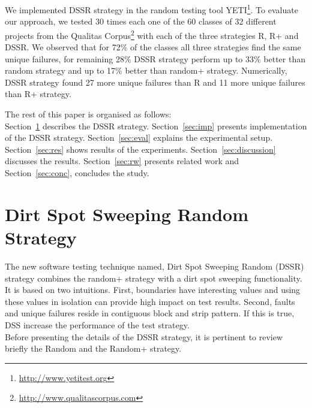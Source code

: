 \documentclass{acm_proc_article-sp}
\begin{document}
We implemented DSSR strategy in the random testing tool YETI\footnote{\url{http://www.yetitest.org}}. To evaluate our approach, we tested 30 times each one of the 60 classes of 32 different projects from the Qualitas Corpus\footnote{\url{http://www.qualitascorpus.com}} with each of the three strategies R, R+ and DSSR. We observed that for 72\% of the classes all three strategies find the same unique failures, for remaining 28\% DSSR strategy perform up to 33\% better than random strategy and up to 17\% better than random+ strategy.
Numerically, DSSR strategy found 27 more unique failures than R and 11 more unique failures than R+ strategy.


The rest of this paper is organised as follows: \\ Section~\ref{sec:dssr} describes the DSSR strategy. Section~\ref{sec:imp} presents implementation of the DSSR strategy. Section~\ref{sec:eval} explains the experimental setup. Section~\ref{sec:res} shows results of the experiments. Section~\ref{sec:discussion} discusses the results. Section~\ref{sec:rw} presents related work and Section~\ref{sec:conc}, concludes the study.





\section{Dirt Spot Sweeping Random \\ Strategy}\label{sec:dssr}
The new software testing technique named, Dirt Spot Sweeping Random (DSSR) strategy combines the random+ strategy with a dirt spot sweeping functionality. It is based on two intuitions. First, boundaries have interesting values and using these values in isolation can provide high impact on test results. Second, faults and unique failures reside in contiguous block and strip pattern. If this is true, DSS increase the performance of the test strategy. \\Before presenting the details of the DSSR strategy, it is pertinent to review briefly the Random and the Random+ strategy.
\end{document}
